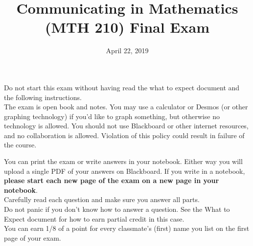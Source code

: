 \documentclass[11pt]{exam}
\title{Communicating in Mathematics (MTH 210) Final Exam}
\date{April 22, 2019}
\begin{document}
\maketitle

\noindent Do not start this exam without having read the what to expect document and the following instructions.\\

\noindent The exam is open book and notes.  You may use a calculator or Desmos (or other graphing technology) if you'd like to graph something, but otherwise no technology is allowed. You should not use Blackboard or other internet resources, and no collaboration is allowed. Violation of this policy could result in failure of the course.

\noindent You can print the exam or write answers in your notebook. Either way you will upload a single PDF of your answers on Blackboard. If you write in a notebook, {\bf please start each new page of the exam on a new page in your notebook}.\\

\noindent Carefully read each question and make sure you answer all parts.\\

\noindent Do not panic if you don't know how to answer a question. See the What to Expect document for how to earn partial credit in this case.\\

\noindent You can earn 1/8 of a point for every classmate's (first) name you list on the first page of your exam.






\addpoints

\begin{center}
\gradetable[v]
\end{center}





\pagebreak
\end{document}
